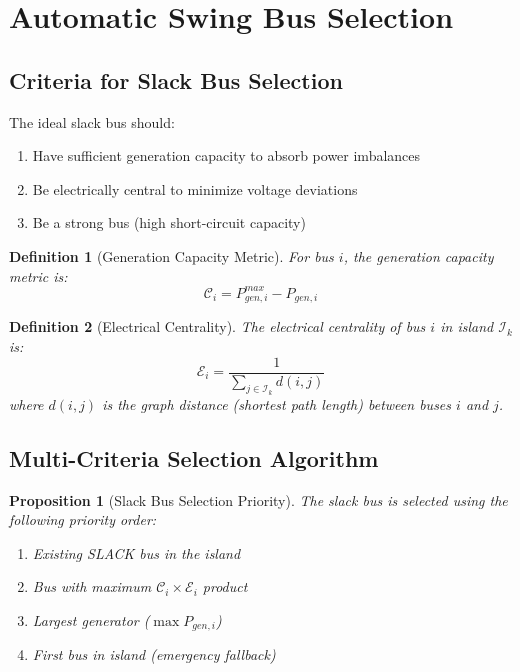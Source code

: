 \documentclass[11pt]{article}
\newtheorem{proposition}{Proposition}
\newtheorem{definition}{Definition}
\begin{document}
\section{Automatic Swing Bus Selection}

\subsection{Criteria for Slack Bus Selection}

The ideal slack bus should:
\begin{enumerate}
    \item Have sufficient generation capacity to absorb power imbalances
    \item Be electrically central to minimize voltage deviations
    \item Be a strong bus (high short-circuit capacity)
\end{enumerate}

\begin{definition}[Generation Capacity Metric]
For bus $i$, the generation capacity metric is:
\begin{equation}
\mathcal{C}_i = P_{gen,i}^{max} - P_{gen,i}
\end{equation}
\end{definition}

\begin{definition}[Electrical Centrality]
The electrical centrality of bus $i$ in island $\mathcal{I}_k$ is:
\begin{equation}
\mathcal{E}_i = \frac{1}{\sum_{j \in \mathcal{I}_k} d(i,j)}
\end{equation}
where $d(i,j)$ is the graph distance (shortest path length) between buses $i$ and $j$.
\end{definition}

\subsection{Multi-Criteria Selection Algorithm}

\begin{proposition}[Slack Bus Selection Priority]
The slack bus is selected using the following priority order:
\begin{enumerate}
    \item Existing SLACK bus in the island
    \item Bus with maximum $\mathcal{C}_i \times \mathcal{E}_i$ product
    \item Largest generator ($\max P_{gen,i}$)
    \item First bus in island (emergency fallback)
\end{enumerate}
\end{proposition}
\end{document}
